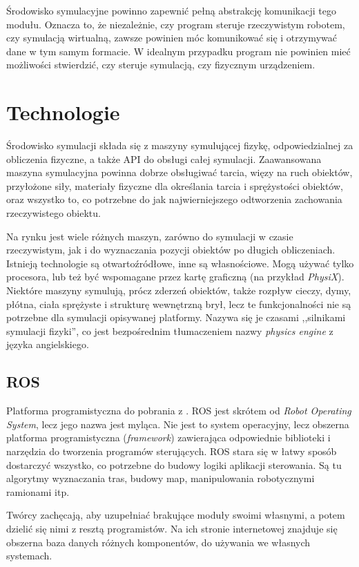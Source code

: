 	Środowisko symulacyjne powinno zapewnić pełną abstrakcję komunikacji tego modułu.
	Oznacza to, że niezależnie, czy program steruje rzeczywistym robotem, czy symulacją wirtualną, zawsze powinien móc komunikować się i otrzymywać dane w tym samym formacie.
	W idealnym przypadku program nie powinien mieć możliwości stwierdzić, czy steruje symulacją, czy fizycznym urządzeniem.

\section{Technologie}
	Środowisko symulacji składa się z maszyny symulującej fizykę, odpowiedzialnej za obliczenia fizyczne, a także API do obsługi całej symulacji.
	Zaawansowana maszyna symulacyjna powinna dobrze obsługiwać tarcia, więzy na ruch obiektów, przyłożone siły, materiały fizyczne dla określania tarcia i sprężystości obiektów, 
	oraz wszystko to, co potrzebne do jak najwierniejszego odtworzenia zachowania rzeczywistego obiektu.

	Na rynku jest wiele różnych maszyn, zarówno do symulacji w czasie rzeczywistym, jak i do wyznaczania pozycji obiektów po długich obliczeniach.
	Istnieją technologie są otwartoźródłowe, inne są własnościowe. Mogą używać tylko procesora, lub też być wspomagane przez kartę graficzną (na przykład \emph{PhysiX}).
	Niektóre maszyny symulują, prócz zderzeń obiektów, także rozpływ cieczy, dymy, płótna, ciała sprężyste i strukturę wewnętrzną brył, 
	lecz te funkcjonalności nie są potrzebne dla symulacji opisywanej platformy. Nazywa się je czasami ,,silnikami symulacji fizyki'', co jest bezpośrednim tłumaczeniem nazwy
	\emph{physics engine} z języka angielskiego.
	
	\subsection{ROS}
	Platforma programistyczna do pobrania z \cite{ros_website}.
	ROS jest skrótem od \emph{Robot Operating System}, lecz jego nazwa jest myląca.
	Nie jest to system operacyjny, lecz obszerna platforma programistyczna (\emph{framework}) zawierająca odpowiednie biblioteki i narzędzia do tworzenia programów sterujących.
	ROS stara się w łatwy sposób dostarczyć wszystko, co potrzebne do budowy logiki aplikacji sterowania.
	Są tu algorytmy wyznaczania tras, budowy map, manipulowania robotycznymi ramionami itp. 

	Twórcy zachęcają, aby uzupełniać brakujące moduły swoimi własnymi, a potem dzielić się nimi z resztą programistów.
	Na ich stronie internetowej znajduje się obszerna baza danych różnych komponentów, do używania we własnych systemach.

